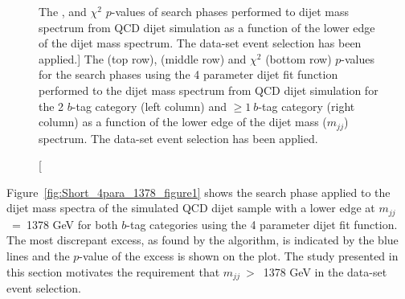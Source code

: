 \begin{figure}[!htb]
\begin{center}
  \end{center}
  \vspace{-1em}
  \caption
      [The \bh{},  \dhunt{}  and $\chi^{2}$ \mbox{$p$-value}s
      of search phases performed to dijet mass spectrum from QCD dijet simulation
      as a function of the lower edge of the dijet mass spectrum.
      The \summer{} data-set event selection has been applied.]
      {The \bh{} (top row),  \dhunt{} (middle row) and $\chi^{2}$ (bottom row) \mbox{$p$-value}s
    for the search phases using the 4 parameter dijet fit function
    performed to the dijet mass spectrum from QCD dijet simulation
    for the 2 $b$-tag category (left column) and $\geq1~b$-tag category (right column)
    as a function of the lower edge of the dijet mass ($m_{jj}$) spectrum.
    The \summer{} data-set event selection has been applied.}
  \label{fig:mjjGraphs}
\end{figure}

Figure~\ref{fig:Short_4para_1378_figure1} shows the search phase applied to the dijet mass spectra
of the simulated QCD dijet sample with a lower edge at $m_{jj}$~=~1378 GeV for both $b$-tag categories
 using the 4 parameter dijet fit function.
The most discrepant excess, as found by the \bh{} algorithm, is indicated by the blue lines
and the \mbox{$p$-value} of the excess is shown on the plot.
The study presented in this section motivates the requirement that $m_{jj}~>$~1378 GeV in the \summer{} data-set event selection.


